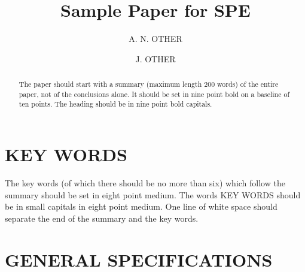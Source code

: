 %
%


\def\sysdetails{}

\title{Sample Paper for SPE}
\author{A. N. OTHER}

\titlehead{SAMPLE PAPER FOR SPE}

\maketitle

\author{J. OTHER}
\makeauthor

\begin{abstract}
The paper should start with a summary (maximum length 200 words) of the entire
paper, not of the conclusions alone. It
should be set in nine point bold on a baseline of ten points. The
heading should be in nine point bold capitals.
\end{abstract}




\section*{KEY WORDS}

The key words (of which there should be no more than six) which follow the
summary should be set in
eight point medium. The words KEY WORDS should be in small capitals in
eight point medium. One line of white space should separate the
end of the summary and the key words.

\section*{GENERAL SPECIFICATIONS}

